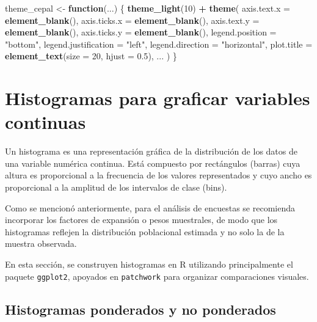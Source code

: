 \documentclass[
  spanish,
  12pt,
]{book}
\newenvironment{Shaded}{\begin{snugshade}}{\end{snugshade}}
\newcommand{\AttributeTok}[1]{\textcolor[rgb]{0.13,0.29,0.53}{#1}}
\newcommand{\ControlFlowTok}[1]{\textcolor[rgb]{0.13,0.29,0.53}{\textbf{#1}}}
\newcommand{\DecValTok}[1]{\textcolor[rgb]{0.00,0.00,0.81}{#1}}
\newcommand{\FloatTok}[1]{\textcolor[rgb]{0.00,0.00,0.81}{#1}}
\newcommand{\FunctionTok}[1]{\textcolor[rgb]{0.13,0.29,0.53}{\textbf{#1}}}
\newcommand{\NormalTok}[1]{#1}
\newcommand{\OtherTok}[1]{\textcolor[rgb]{0.56,0.35,0.01}{#1}}
\newcommand{\SpecialCharTok}[1]{\textcolor[rgb]{0.81,0.36,0.00}{\textbf{#1}}}
\newcommand{\StringTok}[1]{\textcolor[rgb]{0.31,0.60,0.02}{#1}}
\begin{document}
\begin{Shaded}
\begin{Highlighting}[]
\NormalTok{theme\_cepal }\OtherTok{\textless{}{-}} \ControlFlowTok{function}\NormalTok{(...) \{}
  \FunctionTok{theme\_light}\NormalTok{(}\DecValTok{10}\NormalTok{) }\SpecialCharTok{+}
    \FunctionTok{theme}\NormalTok{(}
      \AttributeTok{axis.text.x =} \FunctionTok{element\_blank}\NormalTok{(),}
      \AttributeTok{axis.ticks.x =} \FunctionTok{element\_blank}\NormalTok{(),}
      \AttributeTok{axis.text.y =} \FunctionTok{element\_blank}\NormalTok{(),}
      \AttributeTok{axis.ticks.y =} \FunctionTok{element\_blank}\NormalTok{(),}
      \AttributeTok{legend.position =} \StringTok{"bottom"}\NormalTok{,}
      \AttributeTok{legend.justification =} \StringTok{"left"}\NormalTok{,}
      \AttributeTok{legend.direction =} \StringTok{"horizontal"}\NormalTok{,}
      \AttributeTok{plot.title =} \FunctionTok{element\_text}\NormalTok{(}\AttributeTok{size =} \DecValTok{20}\NormalTok{, }\AttributeTok{hjust =} \FloatTok{0.5}\NormalTok{),}
\NormalTok{      ...}
\NormalTok{    )}
\NormalTok{\}}
\end{Highlighting}
\end{Shaded}

\section{Histogramas para graficar variables continuas}\label{histogramas-para-graficar-variables-continuas}

Un histograma es una representación gráfica de la distribución de los datos de una variable numérica continua. Está compuesto por rectángulos (barras) cuya altura es proporcional a la frecuencia de los valores representados y cuyo ancho es proporcional a la amplitud de los intervalos de clase (bins).

Como se mencionó anteriormente, para el análisis de encuestas se recomienda incorporar los factores de expansión o pesos muestrales, de modo que los histogramas reflejen la distribución poblacional estimada y no solo la de la muestra observada.

En esta sección, se construyen histogramas en R utilizando principalmente el paquete \texttt{ggplot2}, apoyados en \texttt{patchwork} para organizar comparaciones visuales.

\subsection{Histogramas ponderados y no ponderados}\label{histogramas-ponderados-y-no-ponderados}
\end{document}
